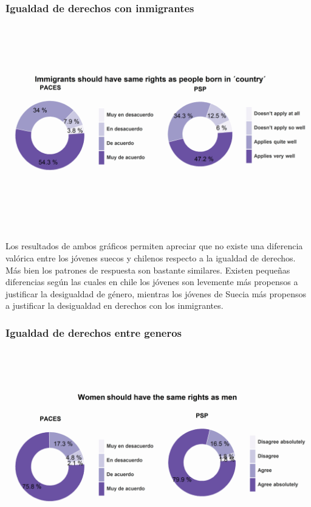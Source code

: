\documentclass[12pt,twoside]{templates/facsothesis}
\begin{document}
\hypertarget{igualdad-de-derechos-con-inmigrantes}{%
\subsubsection{Igualdad de derechos con inmigrantes}\label{igualdad-de-derechos-con-inmigrantes}}

\includegraphics{output/plotinm2.png}

Los resultados de ambos gráficos permiten apreciar que no existe una diferencia valórica entre los jóvenes suecos y chilenos respecto a la igualdad de derechos. Más bien los patrones de respuesta son bastante similares. Existen pequeñas diferencias según las cuales en chile los jóvenes son levemente más propensos a justificar la desigualdad de género, mientras los jóvenes de Suecia más propensos a justificar la desigualdad en derechos con los inmigrantes.

\hypertarget{igualdad-de-derechos-entre-generos}{%
\subsubsection{Igualdad de derechos entre generos}\label{igualdad-de-derechos-entre-generos}}

\includegraphics{output/plotdem.png}
\end{document}
